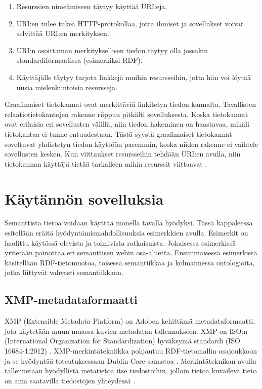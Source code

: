 \documentclass[finnish, 12pt, a4paper, elec, utf8, pdfa, online]{aaltothesis}
\begin{document}
{\begin{enumerate}
\item Resurssien nimeämiseen täytyy käyttää URI:eja.
\item URI:en tulee tukea HTTP-protokollaa, jotta ihmiset ja sovellukset voivat selvittää URI:en merkityksen.
\item URI:n osoittaman merkityksellisen tiedon täytyy olla jossakin standardiformaatissa (esimerkiksi RDF).
\item Käyttäjälle täytyy tarjota linkkejä muihin resursseihin, jotta hän voi löytää uusia mielenkiintoisia resursseja.
\end{enumerate}
\vspace{0.5cm}

Graafimaiset tietokannat ovat merkittäviä linkitetyn tiedon kannalta. Tavallisten relaatiotietokantojen rakenne riippuu pitkälti sovelluksesta. Koska tietokannat ovat erilaisia eri sovellusten välillä, niin tiedon hakeminen on haastavaa, mikäli tietokantaa ei tunne entuudestaan. Tästä syystä graafimaiset tietokannat soveltuvat yhdistetyn tiedon käyttöön paremmin, koska niiden rakenne ei vaihtele sovellusten kesken. Kun viittaukset resursseihin tehdään URI:en avulla, niin tietokannan käyttäjä tietää tarkalleen mihin resurssit viittaavat \cite{cambridge_linked}.

\clearpage
\section{Käytännön sovelluksia}

Semanttista tietoa voidaan käyttää monella tavalla hyödyksi. Tässä kappaleessa esitellään eräitä hyödyntämismahdollisuuksia esimerkkien avulla. Esimerkit on laadittu käytössä olevista ja toimivista ratkaisuista. Jokaisessa esimerkissä yritetään painottaa eri semanttisen webin osa-aluetta. Ensimmäisessä esimerkissä käsitellään RDF-tietomuotoa, toisessa semantiikkaa ja kolmannessa ontologioita, jotka liittyvät vahvasti semantiikkaan.


\subsection{XMP-metadataformaatti}
XMP (Extensible Metadata Platform) on Adoben kehittämä metadataformaatti, jota käytetään muun muassa kuvien metadatan tallennukseen. XMP on ISO:n (International Organization for Standardization) hyväksymä standardi (ISO 16684-1:2012) \cite{XMP_standard}. XMP-merkintätekniikka pohjautuu RDF-tietomallin osajoukkoon ja se hyödyntää toteutuksessaan Dublin Core sanastoa \cite{XMP2}. Merkintäteknikan avulla tallennetaan hyödyllistä metatietoa itse tiedostoihin, jolloin tietoa kuvaileva tieto on aina saatavilla tiedostojen yhteydessä \cite{XMP1}.

}
\end{document}
